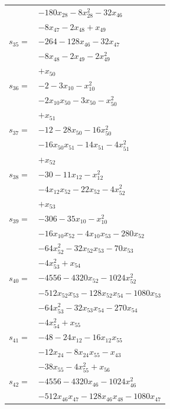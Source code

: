 \begin{longtable}{@{}r@{\;}l@{}}
 & \(\displaystyle -180x_{28} -8x_{28}^{2} -32x_{46}\) \\
 & \(\displaystyle -8x_{47} -2x_{48} +x_{49}\) \\[3pt]
\(s_{35}=\) & \(\displaystyle -264 -128x_{46} -32x_{47}\) \\
 & \(\displaystyle -8x_{48} -2x_{49} -2x_{49}^{2}\) \\
 & \(\displaystyle +x_{50}\) \\[3pt]
\(s_{36}=\) & \(\displaystyle -2 -3x_{10} -x_{10}^{2}\) \\
 & \(\displaystyle -2x_{10}x_{50} -3x_{50} -x_{50}^{2}\) \\
 & \(\displaystyle +x_{51}\) \\[3pt]
\(s_{37}=\) & \(\displaystyle -12 -28x_{50} -16x_{50}^{2}\) \\
 & \(\displaystyle -16x_{50}x_{51} -14x_{51} -4x_{51}^{2}\) \\
 & \(\displaystyle +x_{52}\) \\[3pt]
\(s_{38}=\) & \(\displaystyle -30 -11x_{12} -x_{12}^{2}\) \\
 & \(\displaystyle -4x_{12}x_{52} -22x_{52} -4x_{52}^{2}\) \\
 & \(\displaystyle +x_{53}\) \\[3pt]
\(s_{39}=\) & \(\displaystyle -306 -35x_{10} -x_{10}^{2}\) \\
 & \(\displaystyle -16x_{10}x_{52} -4x_{10}x_{53} -280x_{52}\) \\
 & \(\displaystyle -64x_{52}^{2} -32x_{52}x_{53} -70x_{53}\) \\
 & \(\displaystyle -4x_{53}^{2} +x_{54}\) \\[3pt]
\(s_{40}=\) & \(\displaystyle -4556 -4320x_{52} -1024x_{52}^{2}\) \\
 & \(\displaystyle -512x_{52}x_{53} -128x_{52}x_{54} -1080x_{53}\) \\
 & \(\displaystyle -64x_{53}^{2} -32x_{53}x_{54} -270x_{54}\) \\
 & \(\displaystyle -4x_{54}^{2} +x_{55}\) \\[3pt]
\(s_{41}=\) & \(\displaystyle -48 -24x_{12} -16x_{12}x_{55}\) \\
 & \(\displaystyle -12x_{24} -8x_{24}x_{55} -x_{43}\) \\
 & \(\displaystyle -38x_{55} -4x_{55}^{2} +x_{56}\) \\[3pt]
\(s_{42}=\) & \(\displaystyle -4556 -4320x_{46} -1024x_{46}^{2}\) \\
 & \(\displaystyle -512x_{46}x_{47} -128x_{46}x_{48} -1080x_{47}\) \\

\end{longtable}
